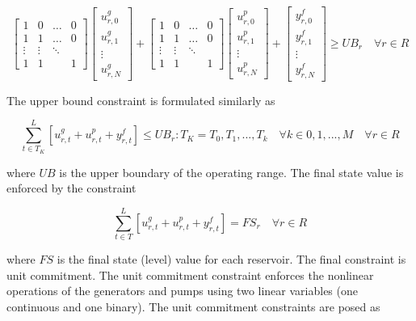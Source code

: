 \documentclass[12pt]{article}
\begin{document}
\begin{equation}
	\begin{bmatrix}
		1 & 0 & \dots & 0\\
		1 & 1 & \dots & 0\\
		\vdots & \vdots &\ddots & \\
		1 & 1 & & 1
	\end{bmatrix}
	\begin{bmatrix}
		u_{r,0}^g \\ u_{r,1}^g \\ \vdots \\ u_{r,N}^g
	\end{bmatrix}+
	\begin{bmatrix}
		1 & 0 & \dots & 0\\
		1 & 1 & \dots & 0\\
		\vdots & \vdots &\ddots & \\
		1 & 1 & & 1
	\end{bmatrix}
	\begin{bmatrix}
		u_{r,0}^p \\ u_{r,1}^p \\ \vdots \\ u_{r,N}^p
	\end{bmatrix}+
	\begin{bmatrix}
		y_{r,0}^f \\ y_{r,1}^f \\ \vdots \\ y_{r,N}^f
	\end{bmatrix}\geq UB_r \quad \forall r \in R
	\label{eq;mat_lb}
\end{equation}

The upper bound constraint is formulated similarly as

\begin{equation}
	\sum_{t\in T_K}^{L}[u_{r,t}^{g}+u_{r,t}^{p}+y_{r,t}^{f}]\leq UB_{r} : T_K=T_0,T_1,...,T_k \quad\forall k \in 0,1,...,M \quad\forall r \in R \label{eq:ub}
\end{equation}

where $UB$ is the upper boundary of the operating range. The final state value is enforced by the constraint

\begin{equation}
	\sum_{t\in T}^{L}[u_{r,t}^{g}+u_{r,t}^{p}+y_{r,t}^{f}]=FS_{r} \quad\forall r \in R \label{eq:fs}
\end{equation}

where $FS$ is the final state (level) value for each reservoir. The final constraint is unit commitment. The unit commitment constraint enforces the nonlinear operations of the generators and pumps using two linear variables (one continuous and one binary). The unit commitment constraints are posed as
\end{document}
